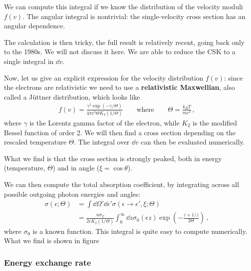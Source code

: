 \documentclass[main.tex]{subfiles}
\begin{document}

We can compute this integral if we know the distribution of the velocity moduli \(f(v)\). The angular integral is nontrivial: the single-velocity cross section has an angular dependence. 

The calculation is then tricky, the full result is relatively recent, going back only to the 1980s. We will not discuss it here.
We are able to reduce the CSK to a single integral in \(\dd{v}\). 

Now, let us give an explicit expression for the velocity distribution \(f(v)\): since the electrons are relativistic we need to use a \textbf{relativistic Maxwellian}, also called a Jüttner distribution, which looks like
%
\begin{align}
f(v) = \frac{\gamma^{5} \exp(- \gamma / \Theta )}{4 \pi c^3 \Theta K_2 (1/\Theta )}
\qquad \text{where} \qquad
\Theta = \frac{k_B T}{mc^2}
\,,
\end{align}
%
where \(\gamma \) is the Lorentz gamma factor of the electron, while \(K_2 \) is the modified Bessel function of order 2.
We will then find a cross section depending on the rescaled temperature \(\Theta \). 
The integral over \(\dd{v}\) can then be evaluated numerically. 

What we find is that the cross section is strongly peaked, both in energy (temperature, \(\Theta \)) and in angle (\(\xi = \cos \theta \)).

We can then compute the total absorption coefficient, by integrating across all possible outgoing photon energies and angles:
%
\begin{align}
\sigma (\epsilon ; \Theta ) &= \int \dd{\Omega }' \dd{\epsilon }' \sigma (\epsilon \to \epsilon ', \xi ; \Theta ) \\
&= \frac{n \sigma_T}{2 \epsilon K_2 (1 / \Theta )}
\int_0^{\infty } \dd{z} \sigma_0 (\epsilon z) \exp(- \frac{z + 1/z}{2 \Theta })
\,,
\end{align}
%
where \(\sigma_0 \) is a known function. This integral is quite easy to compute numerically. 
What we find is shown in figure

\subsubsection{Energy exchange rate}
\end{document}
